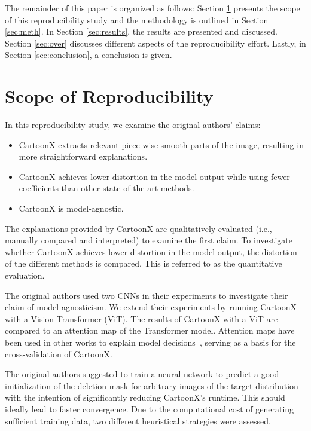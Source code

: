 The remainder of this paper is organized as follows: Section \ref{sec:claims} presents the scope of this reproducibility study and the methodology is outlined in Section \ref{sec:meth}. In Section \ref{sec:results}, the results are presented and discussed. Section \ref{sec:over} discusses different aspects of the reproducibility effort. Lastly, in Section \ref{sec:conclusion}, a conclusion is given. 

\section{Scope of Reproducibility}
\label{sec:claims}

In this reproducibility study, we examine the original authors' claims:
\begin{itemize}
\setlength\itemsep{-0.1em}
    \item CartoonX extracts relevant piece-wise smooth parts of the image, resulting in more straightforward explanations.
    \item CartoonX achieves lower distortion in the model output while using fewer coefficients than other state-of-the-art methods.
    \item CartoonX is model-agnostic.
\end{itemize}

The explanations provided by CartoonX are qualitatively evaluated (i.e., manually compared and interpreted) to examine the first claim. 
To investigate whether CartoonX achieves lower distortion in the model output, the distortion of the different methods is compared. This is referred to as the quantitative evaluation. 

The original authors used two CNNs in their experiments to investigate their claim of model agnosticism.
We extend their experiments by running CartoonX with a Vision Transformer (ViT). The results of CartoonX with a ViT are compared to an attention map of the Transformer model.
Attention maps have been used in other works to explain model decisions~\cite{chefer2021transformer}, serving as a basis for the cross-validation of CartoonX.

The original authors suggested to train a neural network to predict a good initialization of the deletion mask for arbitrary images of the target distribution with the intention of significantly reducing CartoonX's runtime. This should ideally lead to faster convergence. 
Due to the computational cost of generating sufficient training data, two different heuristical strategies were assessed.

